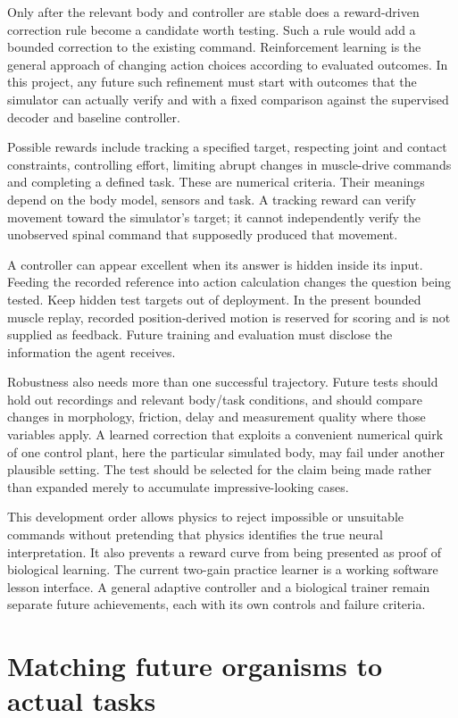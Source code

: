 Only after the relevant body and controller are stable does a reward-driven correction rule become a candidate worth testing. Such a rule would add a bounded correction to the existing command. Reinforcement learning is the general approach of changing action choices according to evaluated outcomes. In this project, any future such refinement must start with outcomes that the simulator can actually verify and with a fixed comparison against the supervised decoder and baseline controller.

Possible rewards include tracking a specified target, respecting joint and contact constraints, controlling effort, limiting abrupt changes in muscle-drive commands and completing a defined task. These are numerical criteria. Their meanings depend on the body model, sensors and task. A tracking reward can verify movement toward the simulator's target; it cannot independently verify the unobserved spinal command that supposedly produced that movement.

A controller can appear excellent when its answer is hidden inside its input. Feeding the recorded reference into action calculation changes the question being tested. Keep hidden test targets out of deployment. In the present bounded muscle replay, recorded position-derived motion is reserved for scoring and is not supplied as feedback. Future training and evaluation must disclose the information the agent receives.

Robustness also needs more than one successful trajectory. Future tests should hold out recordings and relevant body/task conditions, and should compare changes in morphology, friction, delay and measurement quality where those variables apply. A learned correction that exploits a convenient numerical quirk of one control plant, here the particular simulated body, may fail under another plausible setting. The test should be selected for the claim being made rather than expanded merely to accumulate impressive-looking cases.

This development order allows physics to reject impossible or unsuitable commands without pretending that physics identifies the true neural interpretation. It also prevents a reward curve from being presented as proof of biological learning. The current two-gain practice learner is a working software lesson interface. A general adaptive controller and a biological trainer remain separate future achievements, each with its own controls and failure criteria.

\section{Matching future organisms to actual tasks}

